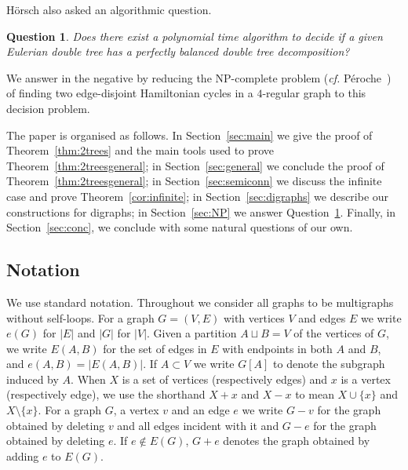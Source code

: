 \documentclass[11pt, reqno, a4paper]{article}
\newtheorem{question}{Question}
\theoremstyle{definition}
\numberwithin{equation}{section}
\begin{document}
H\"orsch also asked an algorithmic question.
\begin{question}\label{conj:algo}
Does there exist a polynomial time algorithm to decide if a given Eulerian double tree has a perfectly balanced double tree decomposition?
\end{question}
We answer in the negative by reducing the NP-complete problem (\textit{cf.} P\'eroche~\cite{peroche1984npcompleteness}) of finding two edge-disjoint Hamiltonian cycles in a $4$-regular graph to this decision problem.

The paper is organised as follows.
In Section~\ref{sec:main} we give the proof of Theorem~\ref{thm:2trees} and the main tools used to prove Theorem~\ref{thm:2treesgeneral};
in Section~\ref{sec:general} we conclude the proof of Theorem~\ref{thm:2treesgeneral};
in Section~\ref{sec:semiconn} we discuss the infinite case and prove Theorem~\ref{cor:infinite};
in Section~\ref{sec:digraphs} we describe our constructions for digraphs;
in Section~\ref{sec:NP} we answer Question~\ref{conj:algo}. Finally, in Section~\ref{sec:conc}, we conclude with some natural questions of our own.

\subsection{Notation}
We use standard notation.
Throughout we consider all graphs to be multigraphs without self-loops.
For a graph $G = (V,E)$ with vertices $V$ and edges $E$ we write $e(G)$ for $|E|$ and $|G|$ for $|V|$.
Given a partition $A\sqcup B=V$ of the vertices of \(G\), we write $E(A,B)$ for the set of edges in $E$ with endpoints in both $A$ and $B$, and $e(A,B)= |E(A,B)|$.
If $A\subset V$ we write $G[A]$ to denote the subgraph induced by $A$.
When $X$ is a set of vertices (respectively edges) and $x$ is a vertex (respectively edge), we use the shorthand $X + x$ and $X - x$ to mean $X\cup \{x\}$ and $X\setminus \{x\}$.
For a graph $G$, a vertex $v$ and an edge $e$ we write $G-v$ for the graph obtained by deleting $v$ and all edges incident with it and $G-e$ for the graph obtained by deleting $e$. If $e \notin E(G)$, $G+e$ denotes the graph obtained by adding $e$ to $E(G)$.
\end{document}
